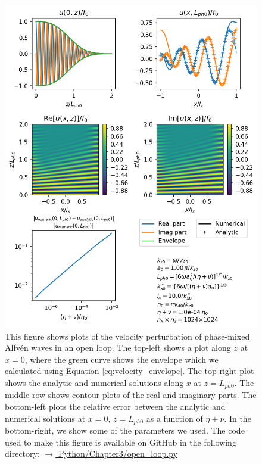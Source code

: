 \begin{figure}
    \centering
    \vspace{-20pt}
    \includegraphics[width=\textwidth,height=0.9\textheight,keepaspectratio]{figures/chapter03/phase_mixing_open_loop.png}
    \vspace{-10pt}
    \caption{This figure shows plots of the velocity perturbation of phase-mixed Alfv\'en waves in an open loop. The top-left shows a plot along $z$ at $x=0$, where the green curve shows the envelope which we calculated using Equation \eqref{eq:velocity_envelope}. The top-right plot shows the analytic and numerical solutions along $x$ at $z=L_{ph0}$. The middle-row shows contour plots of the real and imaginary parts. The bottom-left plots the relative error between the analytic and numerical solutions at $x=0$, $z=L_{ph0}$ as a function of $\eta+\nu$. In the bottom-right, we show some of the parameters we used. The code used to make this figure is available on GitHub in the following directory:\newline
    \href{https://github.com/aleksyprok/apkp_thesis/blob/main/Python/Chapter3/open_loop.py}{$\rightarrow$ Python/Chapter3/open\_loop.py}}
    \vspace{-20pt}
    \label{fig:phase_mxing_open_loop}
\end{figure}

